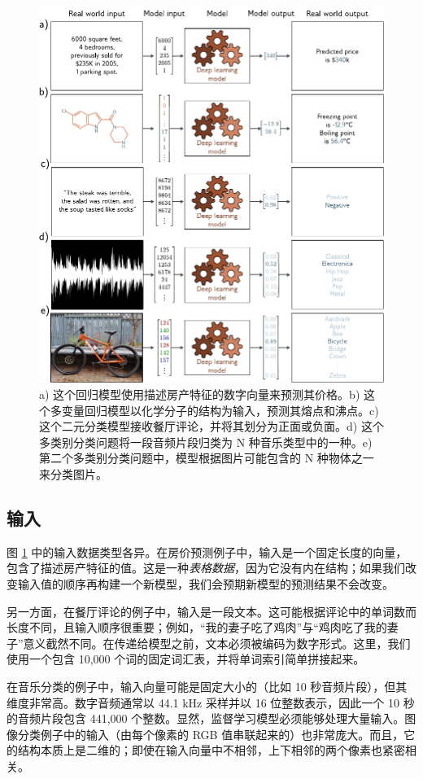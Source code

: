 \documentclass[lang=cn,newtx,10pt,scheme=chinese]{elegantbook}
\begin{document}
\begin{figure}
	\centering
	\includegraphics[width=0.7\linewidth]{PDFFigures/UDLChap1PDF/IntroModels.pdf}
	\caption{a) 这个回归模型使用描述房产特征的数字向量来预测其价格。b) 这个多变量回归模型以化学分子的结构为输入，预测其熔点和沸点。c) 这个二元分类模型接收餐厅评论，并将其划分为正面或负面。d) 这个多类别分类问题将一段音频片段归类为 N 种音乐类型中的一种。e) 第二个多类别分类问题中，模型根据图片可能包含的 N 种物体之一来分类图片。}
    \label{IntroModels}
\end{figure}

\subsection{输入}

图 \ref{IntroModels} 中的输入数据类型各异。在房价预测例子中，输入是一个固定长度的向量，包含了描述房产特征的值。这是一种\textit{表格数据}，因为它没有内在结构；如果我们改变输入值的顺序再构建一个新模型，我们会预期新模型的预测结果不会改变。

另一方面，在餐厅评论的例子中，输入是一段文本。这可能根据评论中的单词数而长度不同，且输入顺序很重要；例如，“我的妻子吃了鸡肉”与“鸡肉吃了我的妻子”意义截然不同。在传递给模型之前，文本必须被编码为数字形式。这里，我们使用一个包含 10,000 个词的固定词汇表，并将单词索引简单拼接起来。

在音乐分类的例子中，输入向量可能是固定大小的（比如 10 秒音频片段），但其维度非常高。数字音频通常以 44.1 kHz 采样并以 16 位整数表示，因此一个 10 秒的音频片段包含 441,000 个整数。显然，监督学习模型必须能够处理大量输入。图像分类例子中的输入（由每个像素的 RGB 值串联起来的）也非常庞大。而且，它的结构本质上是二维的；即使在输入向量中不相邻，上下相邻的两个像素也紧密相关。
\end{document}
